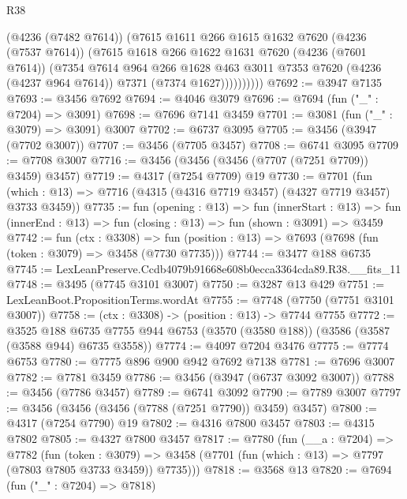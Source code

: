 \begin{lexlean}{R38}
\begin{coremodule}
                (@4236 (@7482 @7614))
                (@7615
                  @1611
                  @266
                  @1615
                  @1632
                  @7620
                  (@4236 (@7537 @7614))
                  (@7615
                    @1618
                    @266
                    @1622
                    @1631
                    @7620
                    (@4236 (@7601 @7614))
                    (@7354
                      @7614
                      @964
                      @266
                      @1628
                      @463
                      @3011
                      @7353
                      @7620
                      (@4236 (@4237 @964 @7614))
                      @7371
                      (@7374 @1627))))))))))
@7692 := @3947 @7135
@7693 := @3456 @7692
@7694 := @4046 @3079
@7696 := @7694 (fun ("_" : @7204) => @3091)
@7698 := @7696 @7141 @3459
@7701 := @3081 (fun ("_" : @3079) => @3091) @3007
@7702 := @6737 @3095
@7705 := @3456 (@3947 (@7702 @3007))
@7707 := @3456 (@7705 @3457)
@7708 := @6741 @3095
@7709 := @7708 @3007
@7716 := @3456 (@3456 (@3456 (@7707 (@7251 @7709)) @3459) @3457)
@7719 := @4317 (@7254 @7709) @19
@7730 := @7701
    (fun (which : @13) => @7716 (@4315 (@4316 @7719 @3457) (@4327 @7719 @3457) @3733 @3459))
@7735 := fun (opening : @13) =>
  fun (innerStart : @13) =>
  fun (innerEnd : @13) => fun (closing : @13) => fun (shown : @3091) => @3459
@7742 := fun (ctx : @3308) =>
  fun (position : @13) => @7693 (@7698 (fun (token : @3079) => @3458 (@7730 @7735)))
@7744 := @3477 @188 @6735
@7745 := LexLeanPreserve.Ccdb4079b91668e608b0ecca3364cda89.R38.__fits_11
@7748 := @3495 (@7745 @3101 @3007)
@7750 := @3287 @13 @429
@7751 := LexLeanBoot.PropositionTerms.wordAt
@7755 := @7748 (@7750 (@7751 @3101 @3007))
@7758 := (ctx : @3308) -> (position : @13) -> @7744 @7755
@7772 := @3525
    @188
    @6735
    @7755
    @944
    @6753
    (@3570 (@3580 @188))
    (@3586 (@3587 (@3588 @944) @6735 @3558))
@7774 := @4097 @7204 @3476
@7775 := @7774 @6753
@7780 := @7775 @896 @900 @942 @7692 @7138
@7781 := @7696 @3007
@7782 := @7781 @3459
@7786 := @3456 (@3947 (@6737 @3092 @3007))
@7788 := @3456 (@7786 @3457)
@7789 := @6741 @3092
@7790 := @7789 @3007
@7797 := @3456 (@3456 (@3456 (@7788 (@7251 @7790)) @3459) @3457)
@7800 := @4317 (@7254 @7790) @19
@7802 := @4316 @7800 @3457
@7803 := @4315 @7802
@7805 := @4327 @7800 @3457
@7817 := @7780
    (fun (__a : @7204) =>
    @7782
      (fun (token : @3079) =>
      @3458 (@7701 (fun (which : @13) => @7797 (@7803 @7805 @3733 @3459)) @7735)))
@7818 := @3568 @13
@7820 := @7694 (fun ("_" : @7204) => @7818)

\end{coremodule}
\end{lexlean}
